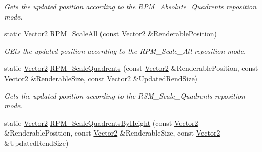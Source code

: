 \begin{DoxyCompactItemize}
\begin{DoxyCompactList}\small\item\em Gets the updated position according to the RPM\_\-Absolute\_\-Quadrents reposition mode. \item\end{DoxyCompactList}\item 
\hypertarget{classMezzanine_1_1UI_1_1ViewportUpdateTool_ace911d531de205198703f23c11fd6b40}{
static \hyperlink{classMezzanine_1_1Vector2}{Vector2} \hyperlink{classMezzanine_1_1UI_1_1ViewportUpdateTool_ace911d531de205198703f23c11fd6b40}{RPM\_\-ScaleAll} (const \hyperlink{classMezzanine_1_1Vector2}{Vector2} \&RenderablePosition)}
\label{classMezzanine_1_1UI_1_1ViewportUpdateTool_ace911d531de205198703f23c11fd6b40}

\begin{DoxyCompactList}\small\item\em GEts the updated position according to the RPM\_\-Scale\_\-All reposition mode. \item\end{DoxyCompactList}\item 
\hypertarget{classMezzanine_1_1UI_1_1ViewportUpdateTool_a97a09f7f484600a789397fad1259365e}{
static \hyperlink{classMezzanine_1_1Vector2}{Vector2} \hyperlink{classMezzanine_1_1UI_1_1ViewportUpdateTool_a97a09f7f484600a789397fad1259365e}{RPM\_\-ScaleQuadrents} (const \hyperlink{classMezzanine_1_1Vector2}{Vector2} \&RenderablePosition, const \hyperlink{classMezzanine_1_1Vector2}{Vector2} \&RenderableSize, const \hyperlink{classMezzanine_1_1Vector2}{Vector2} \&UpdatedRendSize)}
\label{classMezzanine_1_1UI_1_1ViewportUpdateTool_a97a09f7f484600a789397fad1259365e}

\begin{DoxyCompactList}\small\item\em Gets the updated position according to the RSM\_\-Scale\_\-Quadrents reposition mode. \item\end{DoxyCompactList}\item 
\hypertarget{classMezzanine_1_1UI_1_1ViewportUpdateTool_af8dc55cb307a1deaa6fee111833c5458}{
static \hyperlink{classMezzanine_1_1Vector2}{Vector2} \hyperlink{classMezzanine_1_1UI_1_1ViewportUpdateTool_af8dc55cb307a1deaa6fee111833c5458}{RPM\_\-ScaleQuadrentsByHeight} (const \hyperlink{classMezzanine_1_1Vector2}{Vector2} \&RenderablePosition, const \hyperlink{classMezzanine_1_1Vector2}{Vector2} \&RenderableSize, const \hyperlink{classMezzanine_1_1Vector2}{Vector2} \&UpdatedRendSize)}
\label{classMezzanine_1_1UI_1_1ViewportUpdateTool_af8dc55cb307a1deaa6fee111833c5458}


\end{DoxyCompactItemize}
